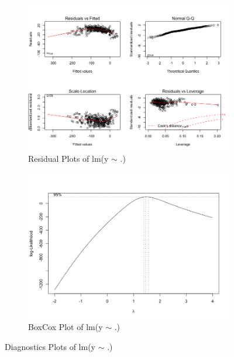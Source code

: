 \documentclass[11pt a4paper]{article}
\begin{document}
\begin{figure}[H]
	\centering
	\begin{subfigure}{.7\textwidth}
		\centering
		\includegraphics[scale=0.4]{resid-m0.png}
		\caption{Residual Plots of lm(y $\sim$ .)}
		\label{fig:resid-m0}
	\end{subfigure}%
	\begin{subfigure}{.3\textwidth}
		\centering
		\includegraphics[scale=0.2]{boxcox-m0.png}
		\caption{BoxCox Plot of lm(y $\sim$ .)}
		\label{fig:boxcox-m0}
	\end{subfigure}
	\caption{Diagnostics Plots of lm(y $\sim$ .)}
	\label{fig:diagnostics-m0}
\end{figure}
\end{document}
